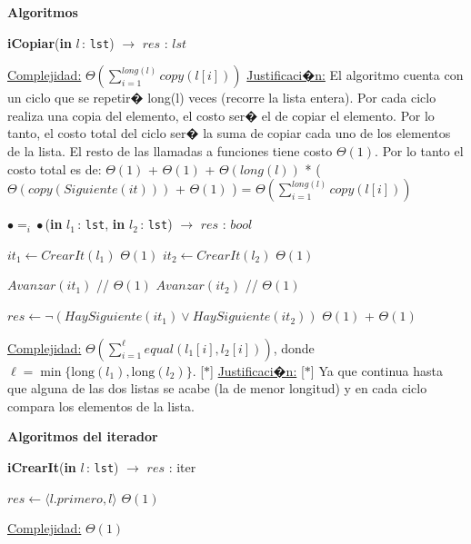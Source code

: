 \documentclass[a4paper,10pt]{article}
\let\TipoVariable=\texttt
\let\ModificadorArgumento=\textbf
\newcommand{\In}[2]{\ModificadorArgumento{in} \ensuremath{#1}\,: \TipoVariable{#2}\xspace}
\newenvironment{Algoritmos}{%
  \vspace*{2ex}%
  \noindent\textbf{\Large Algoritmos}%
  \vspace*{2ex}%
}{}
\newcommand{\Titulo}[1]{
  \vspace*{1ex}\par\noindent\textbf{\large #1}\par
}
\begin{document}
\begin{Algoritmos}
\begin{algorithm}[H]{\textbf{iCopiar}(\In{l}{lst}) $\to$ $res$ : $lst$}
\begin{algorithmic}[1]
		\medskip
		\Statex \underline{Complejidad:} $\Theta\left(\sum_{i=1}^{long(l)}copy({l[i]})\right)$
		\Statex \underline{Justificaci�n:} El algoritmo cuenta con un ciclo que se repetir� long(l) veces (recorre la lista entera). Por cada ciclo realiza una copia del elemento, el costo ser� el de copiar el elemento. Por lo tanto, el costo total del ciclo ser� la suma de copiar cada uno de los elementos de la lista. El resto de las llamadas a funciones tiene costo $\Theta(1)$. Por lo tanto el costo total es de: $\Theta(1)$  + $\Theta(1)$ + $\Theta(long(l))$ * ($\Theta(copy(Siguiente(it)))$ + $\Theta(1)$ ) = $\Theta\left(\sum_{i=1}^{long(l)}copy({l[i]})\right)$
    \end{algorithmic}
\end{algorithm}	

	
\begin{algorithm}[H]{\textbf{$\bullet =_i \bullet$}(\In{l_1}{lst}, \In{l_2}{lst}) $\to$ $res$ : $bool$}
	\begin{algorithmic}[1]
			\State $it_1 \gets CrearIt(l_1)$	\Comment $\Theta(1)$
			\State $it_2 \gets CrearIt(l_2)$ 	\Comment $\Theta(1)$
			
			  \Comment [$\ast$]
			 	\State $Avanzar(it_1)$ // $\Theta(1)$
				\State $Avanzar(it_2)$	// $\Theta(1)$
			\EndWhile
			
			\State $res \gets \neg(HaySiguiente(it_1) \lor HaySiguiente(it_2))$	\Comment $\Theta(1)$ + $\Theta(1)$
    	
		\medskip
		\Statex \underline{Complejidad:} $\displaystyle\Theta\left(\sum_{i=1}^{\ell}{equal(l_1[i],l_2[i])}\right)$, donde $\ell = \min\{\text{long}(l_1),\text{long}(l_2)\}$. [$\ast$]
		\Statex \underline{Justificaci�n:} [$\ast$] Ya que continua hasta que alguna de las dos listas se acabe (la de menor longitud) y en cada ciclo compara los elementos de la lista.
    \end{algorithmic}
\end{algorithm}


\Titulo{Algoritmos del iterador}	
 
\begin{algorithm}[H]
	\begin{algorithmic}[1]
		\State \textbf{iCrearIt}(\In{l}{lst}) $\to$ $res$ : iter
		
			\State $res \gets \langle l.primero, l \rangle$ 	\Comment $\Theta(1)$
    	
		\medskip
		\Statex \underline{Complejidad:} $\Theta(1)$
    \end{algorithmic}
\end{algorithm}	


\end{Algoritmos}
\end{document}
